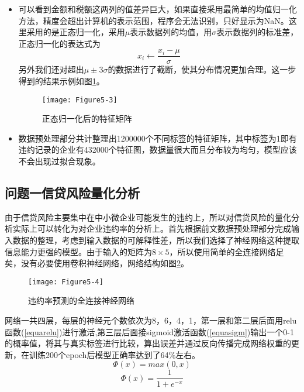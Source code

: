 \documentclass{cumcmthesis}
\begin{document}
\begin{itemize}
    \item 可以看到金额和税额这两列的值差异巨大，如果直接采用最简单的均值归一化方法，精度会超出计算机的表示范围，程序会无法识别，只好显示为NaN。这里采用的是正态归一化，采用$\mu$表示数据列的均值，用$\sigma$表示数据列的标准差，正态归一化的表达式为
    \begin{equation}
        x_i \gets \frac{x_i-\mu}{\sigma}
        \label{equa1}
    \end{equation}
    另外我们还对超出$\mu \pm 3\sigma$的数据进行了截断，使其分布情况更加合理。这一步得到的结果示例如图\ref{fig53}。
    \begin{figure}[H]
        \centering
        \texttt{[image: Figure5-3]}
        \caption{正态归一化后的特征矩阵}
        \label{fig53}
    \end{figure}
    \item 数据预处理部分共计整理出1200000个不同标签的特征矩阵，其中标签为1即有违约记录的企业有432000个特征图，数据量很大而且分布较为均匀，模型应该不会出现过拟合现象。
\end{itemize}

\subsection{问题一信贷风险量化分析}
由于信贷风险主要集中在中小微企业可能发生的违约上，所以对信贷风险的量化分析实际上可以转化为对企业违约率的分析上。首先根据前文数据预处理部分完成输入数据的整理，考虑到输入数据的可解释性差，所以我们选择了神经网络这种提取信息能力更强的模型。由于输入的矩阵为$8 \times 5$，所以使用简单的全连接网络足矣，没有必要使用卷积神经网络，网络结构如图\ref{fig54}。

\begin{figure}[H]
    \centering
    \texttt{[image: Figure5-4]}
    \caption{违约率预测的全连接神经网络}
    \label{fig54}
\end{figure}

网络一共四层，每层的神经元个数依次为8，6，4，1，第一层和第二层后面用relu函数\cite{ref3}(\ref{equarelu})进行激活,第三层后面接sigmoid激活函数(\ref{equasigm})输出一个0-1的概率值，将其与真实标签进行比较，算出误差并通过反向传播完成网络权重的更新，在训练200个epoch后模型正确率达到了64\%左右。
\begin{equation}
    \Phi(x) = max(0,x)
    \label{equarelu}
\end{equation}
\begin{equation}
    \Phi(x) = \frac{1}{1+e^{-x}}
    \label{equasigm}
\end{equation}
\end{document}
